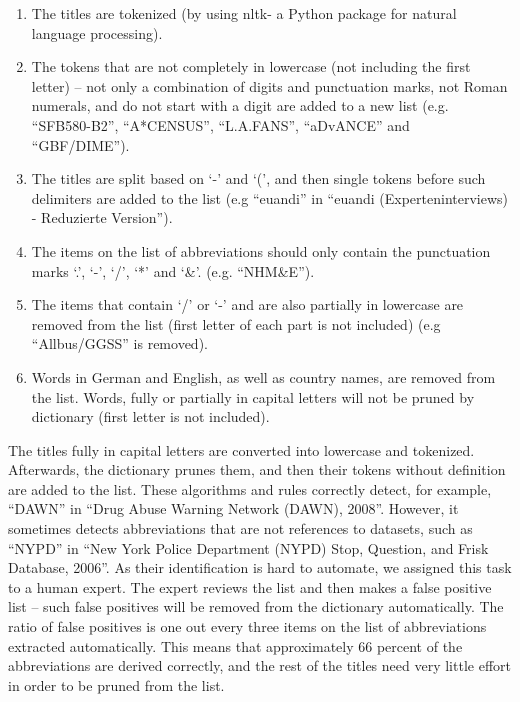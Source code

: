 \documentclass{IOS-Book-Article}
\begin{document}
\begin{enumerate}
	\item The titles are tokenized (by using nltk- a Python package for natural language processing).
	\item The tokens that are not completely in lowercase (not including the first letter) -- not only a combination of digits and punctuation marks, not Roman numerals, and do not start with a digit are added to a new list (e.g. \enquote{SFB580-B2}, \enquote{A*CENSUS}, \enquote{L.A.FANS}, \enquote{aDvANCE}
	and \enquote{GBF/DIME}).
	\item The titles are split based on `-' and `(', and then single tokens before such delimiters are added to the list (e.g \enquote{euandi} in \enquote{euandi (Experteninterviews) - Reduzierte Version}).
	\item The items on the list of abbreviations should only contain the punctuation marks `.', `-', `/', `*' and `\&'. (e.g. \enquote{NHM\&E}).
	\item The items that contain `/' or `-' and are also partially in lowercase are removed from the list (first letter of each part is not included) (e.g \enquote{Allbus/GGSS} is removed). 
	\item Words in German and English, as well as country names, are removed from the list. Words, fully or partially in capital letters will not be pruned by dictionary (first letter is not included).
\end{enumerate}
The titles fully in capital letters are converted into lowercase and tokenized. Afterwards, the dictionary prunes them, and then their tokens without definition are added to the list.
These algorithms and rules correctly detect, for example, \enquote{DAWN} in \enquote{Drug Abuse Warning Network (DAWN), 2008}. However, it sometimes detects abbreviations that are not references to datasets, such as \enquote{NYPD} in \enquote{New York Police Department (NYPD) Stop, Question, and Frisk Database, 2006}. As their identification is hard to automate, we assigned this task to a human expert. 
The expert reviews the list and then makes a false positive list -- such false positives will be removed from the dictionary automatically. The ratio of false positives is one out every three items on the list of abbreviations extracted automatically. This means that approximately 66 percent of the abbreviations are derived correctly, and the rest of the titles need very little effort in order to be pruned from the list.
\end{document}
